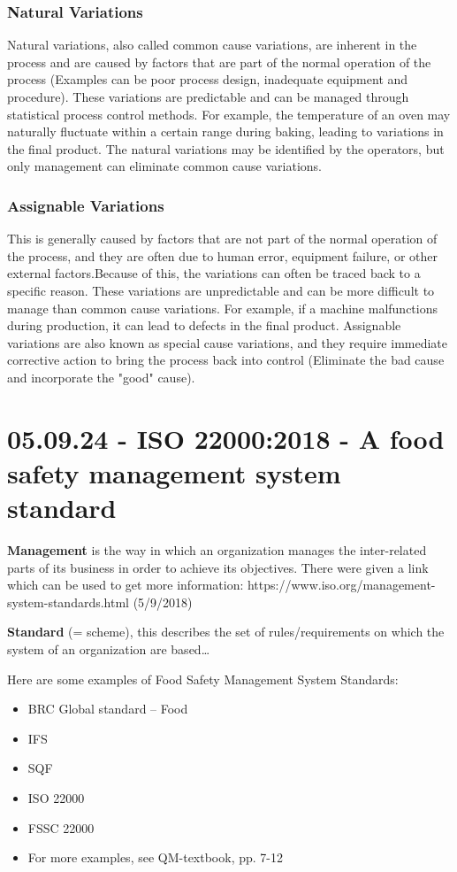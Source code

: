 \subsubsection{Natural Variations}
Natural variations, also called common cause variations, are inherent in the process and are caused by factors that are part of the normal operation of the process (Examples can be poor process design, inadequate equipment and procedure). These variations are predictable and can be managed through statistical process control methods. For example, the temperature of an oven may naturally fluctuate within a certain range during baking, leading to variations in the final product. The natural variations may be identified by the operators, but only management can eliminate common cause variations.

\subsubsection{Assignable Variations}
This is generally caused by factors that are not part of the normal operation of the process, and they are often due to human error, equipment failure, or other external factors.Because of this, the variations can often be traced back to a specific reason. These variations are unpredictable and can be more difficult to manage than common cause variations. For example, if a machine malfunctions during production, it can lead to defects in the final product. Assignable variations are also known as special cause variations, and they require immediate corrective action to bring the process back into control (Eliminate the bad cause and incorporate the "good" cause).




\section{05.09.24 - ISO 22000:2018 - A food safety management system standard}


\textbf{Management} is the way in which an organization manages the inter-related parts of its business in order to achieve its objectives.
There were given a link which can be used to get more information:
https://www.iso.org/management-system-standards.html
(5/9/2018)

\textbf{Standard} (= scheme), this describes the set of rules/requirements on which the system of an organization are based…

Here are some examples of Food Safety Management System Standards:
\begin{highlight}
    \begin{itemize}
        \item BRC Global standard – Food
        \item IFS
        \item SQF
        \item ISO 22000
        \item FSSC 22000
        \item For more examples, see QM-textbook, pp. 7-12
    \end{itemize}
\end{highlight}

